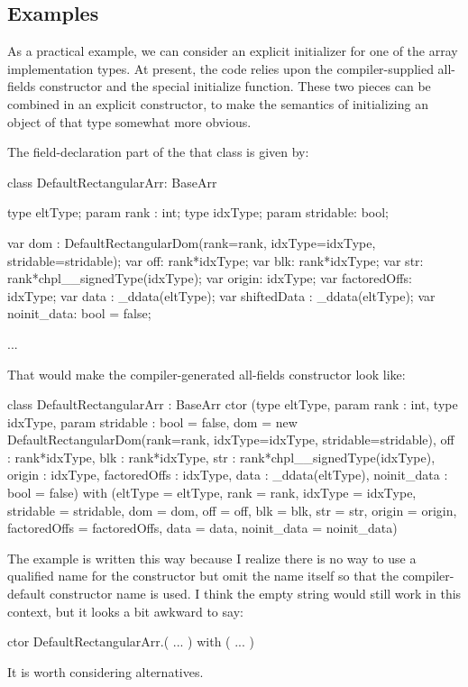 \subsection{Examples}

As a practical example, we can consider an explicit initializer for one of the array
implementation types.  At present, the code relies upon the compiler-supplied all-fields
constructor and the special initialize function.  These two pieces can be combined in an
explicit constructor, to make the semantics of initializing an object of that type
somewhat more obvious.

The field-declaration part of the that class is given by:
\begin{chapel}
  class DefaultRectangularArr: BaseArr {
    type eltType;
    param rank : int;
    type idxType;
    param stridable: bool;
  
    var dom : DefaultRectangularDom(rank=rank, idxType=idxType,
                                           stridable=stridable);
    var off: rank*idxType;
    var blk: rank*idxType;
    var str: rank*chpl__signedType(idxType);
    var origin: idxType;
    var factoredOffs: idxType;
    var data : _ddata(eltType);
    var shiftedData : _ddata(eltType);
    var noinit_data: bool = false;

    ...
  }
\end{chapel}
That would make the compiler-generated all-fields constructor look like:
\begin{chapel}
class DefaultRectangularArr : BaseArr {
  ctor (type eltType,
        param rank : int,
        type idxType,
        param stridable : bool = false,
        dom = new DefaultRectangularDom(rank=rank, idxType=idxType,
                                         stridable=stridable),
        off : rank*idxType,
        blk : rank*idxType,
        str : rank*chpl__signedType(idxType),
        origin : idxType,
        factoredOffs : idxType,
        data : _ddata(eltType),
        noinit_data : bool = false)
    with (eltType = eltType,
          rank = rank,
          idxType = idxType,
          stridable = stridable,
          dom = dom,
          off = off,
          blk = blk,
          str = str,
          origin = origin,
          factoredOffs = factoredOffs,
          data = data,
          noinit_data = noinit_data) {}
}
\end{chapel}

\begin{openissue}
The example is written this way because I realize there is no way to use a qualified name
for the constructor but omit the name itself so that the compiler-default constructor name
is used.  I think the empty string would still work in this context, but it looks a bit
awkward to say:
\begin{chapel}
ctor DefaultRectangularArr.( ... ) with ( ... ) {}
\end{chapel}
It is worth considering alternatives.
\end{openissue}


